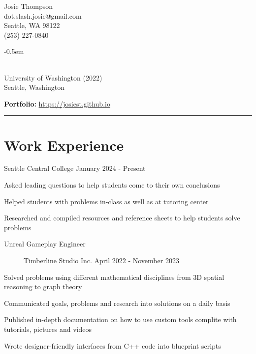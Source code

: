 \documentclass[10pt]{article}
\newenvironment{itemize*}
{\begin{itemize}[leftmargin=*]
    \setlength{\parskip}{0.5pt}}
{\end{itemize}}
\begin{document}
\begin{paracol}{2}
\noindent
\parbox[t]{0.5\textwidth}{
    {\sffamily\Huge Josie Thompson}\medskip\\
    dot.slash.josie@gmail.com \\
    Seattle, WA 98122\\
    (253) 227-0840
}
\switchcolumn

\begin{description}
\itemsep -0.5em
\item[B.S. in Computer Science] \hfill \\
    University of Washington (2022)\\
    Seattle, Washington
\end{description}

\textbf{Portfolio:} \url{https://josiest.github.io}
\end{paracol}
\vspace{12pt}
\hrule

\section*{Work Experience}
\begin{description}[leftmargin=!, labelwidth=\widthof{\bfseries Tutor}]
\item[Tutor] Seattle Central College \hfill 
    January 2024 - Present
\end{description}
\begin{itemize*}
\item Asked leading questions to help students come to their own conclusions
\item Helped students with problems in-class as well as at tutoring center
\item Researched and compiled resources and reference sheets to help students solve problems
\end{itemize*}
\vspace{10pt}

\begin{description}
\item[Unreal Gameplay Engineer] Timberline Studio Inc.
    \hfill April 2022 - November 2023
\end{description}
\begin{itemize*}
\item Solved problems using different mathematical disciplines from 3D spatial reasoning to graph theory
\item Communicated goals, problems and research into solutions on a daily basis
\item Published in-depth documentation on how to use custom tools complite with tutorials, pictures and videos
\item Wrote designer-friendly interfaces from C++ code into blueprint scripts
\end{itemize*}
\vspace{10pt}
\end{document}
